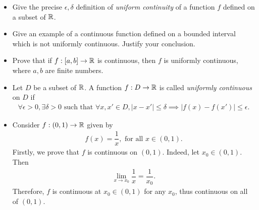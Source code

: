 \begin{problem}
\begin{itemize}
    \item[(a)] Give the precise $\epsilon, \delta$ definition of \textit{uniform continuity} of a function $f$ defined on a subset of $\mathbb{R}$.
    \item[(b)]  Give an example of a continuous function defined on a bounded interval which is not uniformly continuous. Justify your conclusion.
    \item[(c)] Prove that if $f: [a,b] \to \mathbb{R}$ is continuous, then $f$ is uniformly continuous, where $a, b$ are finite numbers.
\end{itemize}
\begin{solution}
\begin{itemize}
    \item[(a)] Let $D$ be a subset of $\mathbb{R}$. A function $f: D \to \mathbb{R}$ is called \emph{uniformly continuous} on $D$ if
    \begin{align*}
        \forall \epsilon > 0, \exists \delta > 0 \text{ such that } \forall x, x'\in D, |x - x'| \le \delta \implies |f(x) - f(x')| \le \epsilon.
    \end{align*}
    \item[(b)] Consider $f: (0,1) \to \mathbb{R}$ given by
    \begin{align*}
        f(x) = \dfrac{1}{x}, \text{ for all } x \in (0,1).
    \end{align*}
    Firstly, we prove that $f$ is continuous on $(0,1)$. Indeed, let $x_0 \in (0,1)$. Then 
    \begin{align*}
        \lim_{x \to x_0} \dfrac{1}{x} = \dfrac{1}{x_0}. 
    \end{align*}
    Therefore, $f$ is continuous at $x_0 \in (0,1)$ for any $x_0$, thus continuous on all of $(0,1)$.
    

\end{itemize}
\end{solution}
\end{problem}
